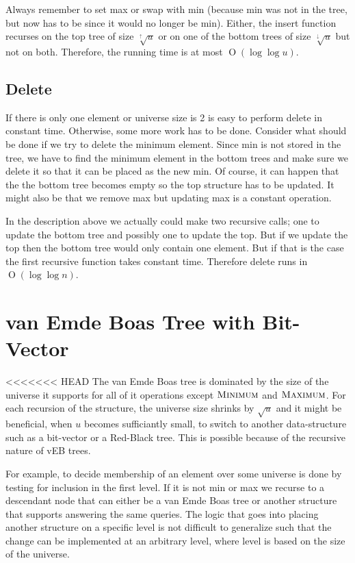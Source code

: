 \documentclass[oneside,11pt,openright]{report}
\newcommand{\BigO}[1]{\ensuremath{\operatorname{O}\left(#1\right)}}
\newcommand{\Minimum}{\textsc{Minimum}}
\newcommand{\Maximum}{\textsc{Maximum}}
\newcommand{\HIGHER}{\sqrt[\uparrow]{u}}
\newcommand{\LOWER}{\sqrt[\downarrow]{u}}
\begin{document}
Always remember to set max or swap with min (because min was not in the tree, but now has to be since it would no longer be min). Either, the insert function recurses on the top tree of size $\HIGHER$ or on one of the bottom trees of size $\LOWER$ but not on both. Therefore, the running time is at most $\BigO{\log \log u}$.

\section{Delete}

If there is only one element or universe size is 2 is easy to perform delete in constant time. Otherwise, some more work has to be done. Consider what should be done if we try to delete the minimum element. Since min is not stored in the tree, we have to find the minimum element in the bottom trees and make sure we delete it so that it can be placed as the new min. Of course, it can happen that the the bottom tree becomes empty so the top structure has to be updated. It might also be that we remove max but updating max is a constant operation.

In the description above we actually could make two recursive calls; one to update the bottom tree and possibly one to update the top. But if we update the top then the bottom tree would only contain one element. But if that is the case the first recursive function takes constant time. Therefore delete runs in $\BigO{\log \log n}$.

\chapter{van Emde Boas Tree with Bit-Vector}

<<<<<<< HEAD
The van Emde Boas tree is dominated by the size of the universe it supports for all of it operations except $\Minimum$ and $\Maximum$. For each recursion of the structure, the universe size shrinks by $\sqrt{u}$ and it might be beneficial, when $u$ becomes sufficiantly small, to switch to another data-structure such as a bit-vector or a Red-Black tree. This is possible because of the recursive nature of vEB trees. 

For example, to decide membership of an element over some universe is done by testing for inclusion in the first level. If it is not min or max we recurse to a descendant node that can either be a van Emde Boas tree or another structure that supports answering the same queries. The logic that goes into placing another structure on a specific level is not difficult to generalize such that the change can be implemented at an arbitrary level, where level is based on the size of the universe.
\end{document}
